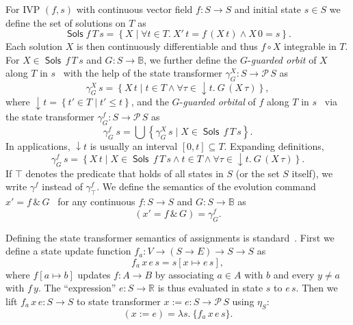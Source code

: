 \documentclass[envcountsame]{llncs}
\newcommand{\Pow}{\mathcal{P}}
\newcommand{\reals}{\mathbb{R}}
\newcommand{\bools}{\mathbb{B}}
\newcommand{\Sols}{\mathop{\mathsf{Sols}}}
\begin{document}
For IVP $(f,s)$ with continuous vector field $f:S\to S$ and initial
state $s\in S$ we define the set of solutions on
$T$ as
\begin{equation*}
\Sols f\, T\, s = \left\{X \mid \forall t\in T.\  X'\, t = f\, (X\, t)\land X\, 0 = s\right\}.
\end{equation*}
Each solution $X$ is then continuously differentiable and thus
$f\circ X$ integrable in $T$.  For $X\in \Sols\, f\, T\, s$ and
$G:S\to\bools$, we further define the $G$-\emph{guarded orbit} of $X$
along $T$ in $s$~\cite{MuniveS19} with the help of the state transformer
$\gamma^X_G:S\to \Pow\, S$ as 
\begin{equation*}
\gamma^X_{G}\, s= \left\{X\, t\mid t\in T\land \forall \tau\in
{\downarrow}t.\ G\, (X\, \tau)\right\},
\end{equation*}
where ${\downarrow}t = \left\{t'\in T\mid t'\le t\right\}$, and the
$G$-\emph{guarded orbital} of $f$ along $T$ in $s$~\cite{MuniveS19}
via the state transformer $\gamma^f_G:S\to \Pow\, S$ as
\begin{equation*}
  \gamma^f_G\ s = \bigcup\left\{\gamma^X_G\, s\mid X\in \Sols\, f\, T\, s\right\}.
\end{equation*}
In applications, ${\downarrow}t$ is usually an interval
$[0,t]\subseteq T$.  Expanding definitions,
\begin{equation*}
\gamma^f_G\, s = \left\{X\, t \mid X\in \Sols\, f\, T\, s \land t\in T
\land \forall \tau\in{\downarrow}t.\ G\, (X\, \tau)\right\}.
\end{equation*}
If $\top$ denotes the predicate that holds of all states in $S$ (or
the set $S$ itself), we write $\gamma^f$ instead of
$\gamma^f_\top$. We define the semantics of the evolution command
$x'= f\, \&\, G$~\cite{MuniveS19} for any continuous $f:S\to S$ and
$G:S\to \bools$ as
\begin{equation}
{\left(x'= f\, \&\, G\right)} = \gamma^f_G.\label{eq:st-evl}\tag{st-evl}
\end{equation}

Defining the state transformer semantics of assignments is
standard~\cite{MuniveS19}. First we define a state update
function $f_a:V\to (S \to E) \to S\to S$ as
\begin{equation*}
f_a\, x\, e\, s = s[x\mapsto e\, s],
\end{equation*}
where $f[a\mapsto b]$ updates $f:A\to B$ by associating $a\in A$ with
$b$ and every $y\neq a$ with $f\, y$.  The ``expression''
${e:S\to \reals}$ is thus evaluated in state $s$ to $e\, s$.  Then we
lift $f_a\, x\, e:S\to S$ to state transformer
$x:= e:S \to \Pow\, S$ using $\eta_S$:
\begin{equation}
  (x:= e) = \lambda s.\ \{f_a\, x\, e\, s\}.\label{eq:st-assgn}\tag{st-assgn}
\end{equation}
\end{document}
